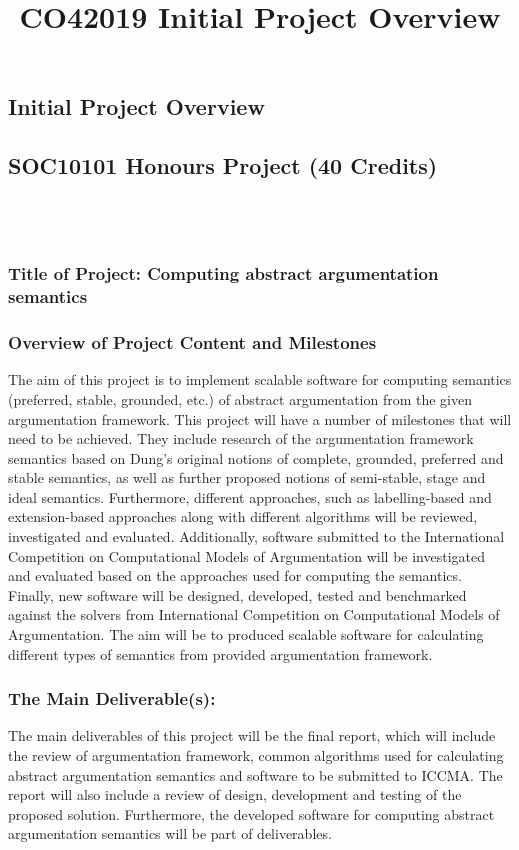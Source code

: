 \documentclass{article}
\title{CO42019 Initial Project Overview}
\begin{document}
\clearpage\setcounter{page}{1}\subsection{Initial Project Overview}
\subsection[SOC10101 Honours Project (40 Credits) \ \ \ \ \ \ \ \ \ \ \ \ \ \ \ \ \ \ \ \ \ \ \ \ \ \ \ \ \ \ \ \ \ \ \ \ \ \ \ \ \ \ \ \ \ \ \ \ \ \ \ \ \ ]{SOC10101 Honours Project (40 Credits) \ \ \ \ \ \ \ \ \ \ \ \ \ \ \ \ \ \ \ \ \ \ \ \ \ \ \ \ \ \ \ \ \ \ \ \ \ \ \ \ \ \ \ \ \ \ \ \ \ \ \ \ \ }
\subsubsection{Title of Project: Computing abstract argumentation semantics}

\bigskip

\subsubsection{Overview of Project Content and Milestones}
The aim of this project is to implement scalable software for computing semantics (preferred, stable, grounded, etc.) of abstract argumentation from the given argumentation framework. This project will have a number of milestones that will need to be achieved. They include research of the argumentation framework semantics based on Dung's original notions of complete, grounded, preferred and stable semantics, as well as further proposed notions of semi-stable, stage and ideal semantics. Furthermore, different approaches, such as labelling-based and extension-based approaches along with different algorithms will be reviewed, investigated and evaluated. Additionally, software submitted to the International Competition on Computational Models of Argumentation will be investigated and evaluated based on the approaches used for computing the semantics. Finally, new software will be designed, developed, tested and benchmarked against the solvers from International Competition on Computational Models of Argumentation. The aim will be to produced scalable software for calculating different types of semantics from provided argumentation framework.

\subsubsection{The Main Deliverable(s):}
The main deliverables of this project will be the final report, which will include the review of argumentation framework, common algorithms used for calculating abstract argumentation semantics and software to be submitted to ICCMA. The report will also include a review of design, development and testing of the proposed solution. Furthermore, the developed software for computing abstract argumentation semantics will be part of deliverables.
\end{document}
